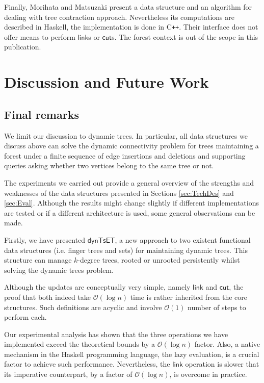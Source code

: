 \documentclass{elsarticle}
\newcommand{\MATHSF}[1]{\ensuremath{\mathsf{#1}}\xspace}
\newcommand{\link}{\MATHSF{link}}
\newcommand{\cut}{\MATHSF{cut}}
\newcommand{\dyntset}{\MATHSF{dynTsET}}
\renewcommand{\O}{\ensuremath{\mathcal{O}}}
\begin{document}
Finally, Morihata and Matsuzaki \cite{TreeContraction} present a data structure and an algorithm for dealing with tree contraction approach. Nevertheless its computations are described in Haskell, the implementation is done in C\texttt{++}. Their interface does not offer means to perform {\link}s or {\cut}s. The forest context is out of the scope in this publication.


\section{Discussion and Future Work} 
\label{sec:Concl} 
\label{sec:discussion}

\subsection{Final remarks}

We limit our discussion to dynamic trees. In particular, all data structures we discuss above can solve the dynamic connectivity problem for trees maintaining a forest under a finite sequence of edge insertions and deletions and supporting queries asking whether two vertices belong to the same tree or not.

The experiments we carried out provide a general overview of the strengths and weaknesses of the data structures presented in Sections \ref{sec:TechDes} and \ref{sec:Eval}. Although the results might change slightly if different implementations are tested or if a different architecture is used, some general observations can be made.

Firstly, we have presented \dyntset, a new approach to two existent functional data structures (i.e. finger trees and sets) for maintaining dynamic trees. This structure can manage $k$-degree trees, rooted or unrooted persistently whilst solving the dynamic trees problem. 

Although the updates are conceptually very simple, namely \link and \cut, the proof that both indeed take $\O(\log n)$ time is rather inherited from the core structures. Such definitions are acyclic and involve $\O(1)$ number of steps to perform each. 

Our experimental analysis has shown that the three operations we have implemented exceed the theoretical bounds by a $\O(\log n)$ factor. Also, a native mechanism in the Haskell programming language, the lazy evaluation, is a crucial factor to achieve such performance. Nevertheless, the \link operation is slower that its imperative counterpart, by a factor of $\O(\log n)$, is overcome in practice.
\end{document}

